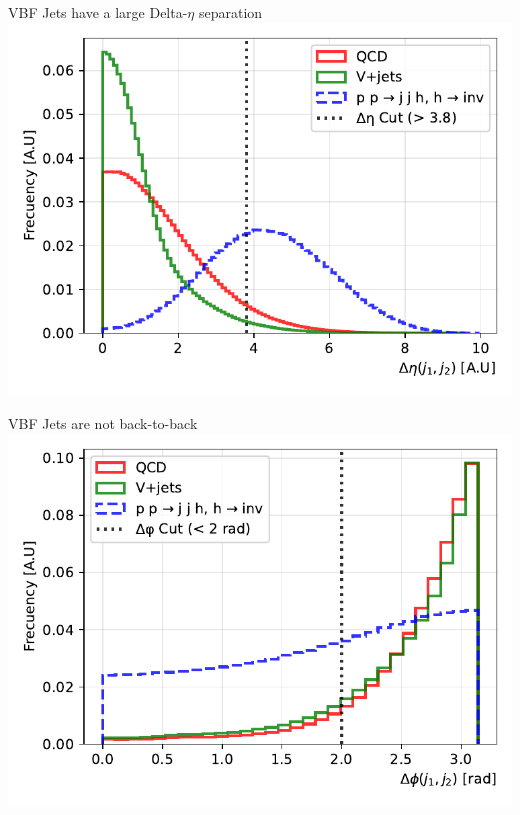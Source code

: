 \documentclass{../../bredelebeamer}
\begin{document}
\begin{frame}{VBF Jets have a large Delta-$\eta$ separation}
    \includegraphics[width=\textwidth]{../Images/delta_eta_comparison.pdf}
\end{frame}
\begin{frame}{VBF Jets are not back-to-back}
    \includegraphics[width=\textwidth]{../Images/delta_phi_comparison.pdf}
\end{frame}
\end{document}
